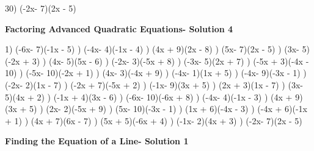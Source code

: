 \documentclass{article}%
\begin{document}
30) (-2x- 7)(2x - 5)%
\newline%
\newpage%
\large%
\begin{center}%
\textbf{Factoring Advanced Quadratic Equations- Solution 4}%
\newline%
\end{center} \normalsize%
1) (-6x- 7)(-1x - 5)%
) (-4x- 4)(-1x - 4)%
) (4x + 9)(2x - 8)%
) (5x- 7)(2x - 5)%
) (3x- 5)(-2x + 3)%
) (4x- 5)(5x - 6)%
) (-2x- 3)(-5x + 8)%
) (-3x- 5)(2x + 7)%
) (-5x + 3)(-4x - 10)%
) (-5x- 10)(-2x + 1)%
) (4x- 3)(-4x + 9)%
) (-4x- 1)(1x + 5)%
) (-4x- 9)(-3x - 1)%
) (-2x- 2)(1x - 7)%
) (-2x + 7)(-5x + 2)%
) (-1x- 9)(3x + 5)%
) (2x + 3)(1x - 7)%
) (3x- 5)(4x + 2)%
) (-1x + 4)(3x - 6)%
) (-6x- 10)(-6x + 8)%
) (-4x- 4)(-1x - 3)%
) (4x + 9)(3x + 5)%
) (2x- 2)(-5x + 9)%
) (5x- 10)(-3x - 1)%
) (1x + 6)(-4x - 3)%
) (-4x + 6)(-1x + 1)%
) (4x + 7)(6x - 7)%
) (5x + 5)(-6x + 4)%
) (-1x- 2)(4x + 3)%
) (-2x- 7)(2x - 5)%
\newline%
\newpage%
\large%
\begin{center}%
\textbf{Finding the Equation of a Line- Solution 1}%
\newline%
\end{center} \normalsize%
\end{document}
